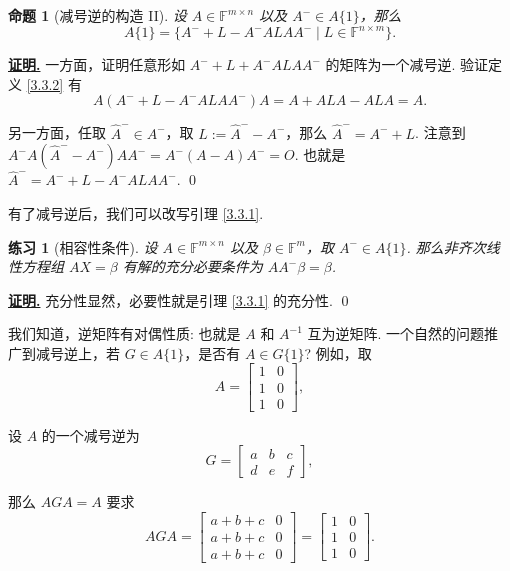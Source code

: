 \documentclass[10pt,openany]{article}
\theoremstyle{thmstyle} %
\newtheorem{practice}{练习}[section]
\theoremstyle{defstyle} %
\theoremstyle{prostyle} %
\newtheorem{proposition}[theorem]{命题}
\theoremstyle{exastyle}
\theoremstyle{remstyle}
\renewenvironment{proof}[1][证明]{\par\underline{\textbf{#1.}} \;\fangsong}{\qed\par}
\newcommand{\F}{\mathbb{F}}
\newcommand{\mn}{^{m \times n}}
\newcommand{\nm}{^{n \times m}}
\begin{document}
\begin{proposition}[减号逆的构造 II]
	设 \( A \in \F\mn \) 以及 \( A^{-} \in A\{1\} \)，那么
	\[ A\{1\}=\{A^{-}+L-A^{-}ALAA^{-} \mid L \in \F\nm \}. \]
\end{proposition}

\begin{proof}
	一方面，证明任意形如 \( A^{-}+L+A^{-}ALAA^{-}  \) 的矩阵为一个减号逆. 验证定义 \ref{3.3.2} 有 
	\[ A(A^{-}+L-A^{-}ALAA^{-})A=A+ALA-ALA=A. \]
	
	另一方面，任取 \( \hat{A}^{-} \in A^{-} \)，取 \( L:=\hat{A}^{-}-A^{-} \)，那么 \( \hat{A}^{-}=A^{-}+L \). 注意到 \( A^{-}A(\hat{A}^{-}-A^{-})AA^{-}=A^{-}(A-A)A^{-}=O \). 也就是 \( \hat{A}^{-}=A^{-}+L-A^{-}ALAA^{-} \).
\end{proof}

有了减号逆后，我们可以改写引理 \ref{3.3.1}.

\begin{practice}[相容性条件] \label{prac3.15}
	设 \( A \in \F\mn \) 以及 \( \beta \in \F^m \)，取 \( A^{-} \in A\{1\} \). 那么非齐次线性方程组 \( AX=\beta \) 有解的充分必要条件为 \( AA^{-}\beta=\beta \).
\end{practice}

\begin{proof}
	充分性显然，必要性就是引理 \ref{3.3.1} 的充分性.
\end{proof}

我们知道，逆矩阵有对偶性质: 也就是 \( A \) 和 \( A^{-1} \) 互为逆矩阵. 一个自然的问题推广到减号逆上，若 \( G \in A\{1\} \)，是否有 \( A \in G\{1\} \)? 例如，取
\[ A=\begin{bmatrix}
	1 & 0 \\ 1 & 0 \\ 1 & 0
\end{bmatrix}, \]

设 \( A \) 的一个减号逆为 
\[ G=\begin{bmatrix}
	a & b & c \\
	d & e & f
\end{bmatrix}, \]

那么 \( AGA=A \) 要求
\[ AGA=\begin{bmatrix}
	a+b+c & 0 \\ a+b+c & 0 \\ a+b+c & 0
\end{bmatrix}=\begin{bmatrix}
1 & 0 \\ 1 & 0 \\ 1 & 0
\end{bmatrix}. \]
\end{document}
